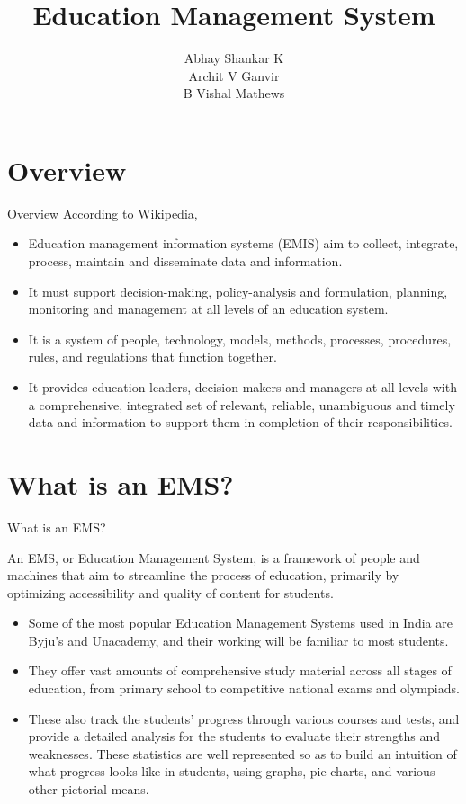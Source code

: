 \documentclass{beamer}
\begin{document}
\newcommand{\bfr}[2]{\section{#1} \begin{frame}{#1} #2 \end{frame}}

	\title{Education Management System}
		\author{Abhay Shankar K \\Archit V Ganvir \\B Vishal Mathews}

	\begin{frame}
    		\titlepage 
	\end{frame}
	
	\begin{frame}
		\tableofcontents
	\end{frame}


	

\bfr{Overview}{
	According to Wikipedia,
	\begin{itemize}
		\item Education management information systems (EMIS) aim to collect, integrate, process, maintain and disseminate data and information.
		\item It must support decision-making, policy-analysis and formulation, planning, monitoring and management at all levels of an education system. 
		\item It is a system of people, technology, models, methods, processes, procedures, rules, and regulations that function together.
		\item It provides education leaders, decision-makers and managers at all levels with a comprehensive, integrated set of relevant, reliable, unambiguous and timely data and information to support them in completion of their responsibilities.
	\end{itemize}
		}
		
\bfr{What is an EMS?}{

An EMS, or Education Management System, is a framework of people and machines that aim to streamline the process of education, primarily by optimizing accessibility and quality of content for students.

\begin{itemize}
	\item Some of the most popular Education Management Systems used in India are Byju's and Unacademy, and their working will be familiar to most students. 

    	\item They offer vast amounts of comprehensive study material across all stages of education, from primary school to competitive national exams and olympiads.

    	\item These also track the students' progress through various courses and tests, and provide a detailed analysis for the students to evaluate their strengths and weaknesses. These statistics are well represented so as to build an intuition of what progress looks like in students, using graphs, pie-charts, and various other pictorial means.

\end{itemize}

}
\end{document}
